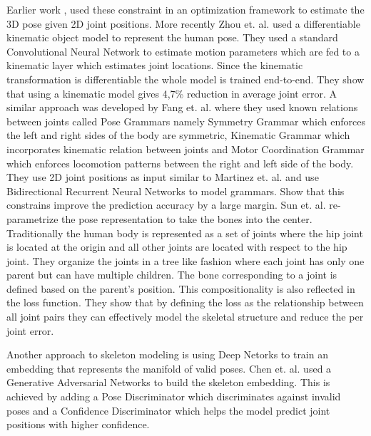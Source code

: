 Earlier work \parencite{barron2001estimating}, \parencite{wei2009modeling} used these constraint in an optimization framework to estimate the 3D pose given 2D joint positions. More recently Zhou et. al. \parencite{zhou2016deep} used a differentiable kinematic object model to represent the human pose. They used a standard Convolutional Neural Network to estimate motion parameters which are fed to a kinematic layer which estimates joint locations. Since the kinematic transformation is differentiable the whole model is trained end-to-end. They show that using a kinematic model gives 4,7\% reduction in average joint error. A similar approach was developed by Fang et. al. \parencite{fang2018learning} where they used known relations between joints called Pose Grammars namely Symmetry Grammar which enforces the left and right sides of the body are symmetric, Kinematic Grammar which incorporates kinematic relation between joints and Motor Coordination Grammar which enforces locomotion patterns between the right and left side of the body. They use 2D joint positions as input similar to Martinez et. al. \parencite{martinez2017simple} and use Bidirectional Recurrent Neural Networks \parencite{schuster1997bidirectional} to model grammars. Show that this constrains improve the prediction accuracy by a large margin. Sun et. al. \parencite{sun2017compositional} re-parametrize the pose representation to take the bones into the center. Traditionally the human body is represented as a set of joints where the hip joint is located at the origin and all other joints are located with respect to the hip joint. They organize the joints in a tree like fashion where each joint has only one parent but can have multiple children. The bone corresponding to a joint is defined based on the parent's position. This compositionality is also reflected in the loss function. They show that by defining the loss as the relationship between all joint pairs they can effectively model the skeletal structure and reduce the per joint error. 

Another approach to skeleton modeling is using Deep Netorks to train an embedding that represents the manifold of valid poses. Chen et. al. \parencite{chen2017adversarial} used a Generative Adversarial Networks \parencite{goodfellow2014generative} to build the skeleton embedding. This is achieved by adding a Pose Discriminator which discriminates against invalid poses and a Confidence Discriminator which helps the model predict joint positions with higher confidence. 

